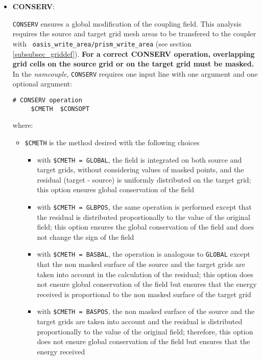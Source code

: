 \begin{itemize}

\item {\bf CONSERV}: 

  {\tt CONSERV} ensures a global modification of the coupling field. 
  This analysis requires the source and target grid mesh areas
  to be transfered to the coupler with {\tt
    oasis\_write\_area/prism\_write\_area} (see section
  \ref{subsubsec_griddef}). {\bf For a correct CONSERV operation, overlapping grid cells 
on the source grid or on the target grid must be masked.} In the {\it namcouple}, {\tt CONSERV}
  requires one input line with one argument and one optional argument:

 \begin{verbatim}
# CONSERV operation
     $CMETH  $CONSOPT
  \end{verbatim}
\vspace{-0.5cm} 
where: 
  \begin{itemize}
  \item {\tt \$CMETH} is the method desired with the following choices
   \begin{itemize}
   \item with {\tt \$CMETH = GLOBAL}, the field is integrated on both
     source and target grids, without considering values of masked
     points, and the residual (target - source) is uniformly
     distributed on the target grid; this option ensures global
     conservation of the field
   \item with {\tt \$CMETH = GLBPOS}, the same operation is performed
     except that the residual is distributed proportionally to the
     value of the original field; this option ensures the global
     conservation of the field and does not change the sign of the field
   \item with {\tt \$CMETH = BASBAL}, the operation is analogous to
     {\tt GLOBAL} except that the non masked surface of the source and
     the target grids are taken into account in
     the calculation of the residual; this option does not ensure
     global conservation of the field but ensures that the energy received is
     proportional to the non masked surface of the target grid
   \item with {\tt \$CMETH = BASPOS}, the non masked surface of the
     source and the target grids are taken into
     account and the residual is distributed proportionally to the
     value of the original field; therefore, this option does not
     ensure global conservation of the field but ensures that the energy received

\end{itemize}
\end{itemize}
\end{itemize}
